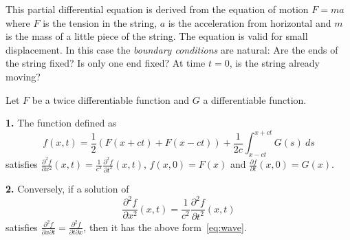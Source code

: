This partial differential equation is derived from the equation of motion \(F = m a\) where \(F\) is the tension in the string, \(a\) is the acceleration from horizontal and \(m\) is the mass of a little piece of the string.
The equation is valid for small displacement.
In this case the \emph{boundary conditions} are natural: Are the ends of the string fixed? Is only one end fixed? At time \(t=0\), is the string already moving?

\begin{theorem}
    Let \(F\) be a twice differentiable function and \(G\) a differentiable function.

    \noindent
    \textbf{1.} The function defined as
    \begin{equation}
        \label{eq:wave}
        f(x,t) = \frac{1}{2}(F(x+ct) + F(x-ct)) + \frac{1}{2c} \int_{x-ct}^{x+ct} G(s) \ ds
    \end{equation}
    satisfies \(   \frac{\partial^2 f}{\partial x^2}(x,t) = \frac1{c^2}  \frac{\partial^2 f}{\partial t^2}(x,t) \),
    \(f(x,0) = F(x)\)
    and \(\frac{\partial f}{\partial t}(x,0) = G(x)\).

    \noindent
    \textbf{2.} Conversely, if a solution of
    \[
        \frac{\partial^2 f}{\partial x^2}(x,t) = \frac1{c^2}  \frac{\partial^2 f}{\partial t^2}(x,t)
    \]
    satisfies
    \(\frac{\partial^2 f}{\partial x \partial t} = \frac{\partial^2 f}{\partial t \partial x}\),
    then it has the above form~\eqref{eq:wave}.
\end{theorem}


